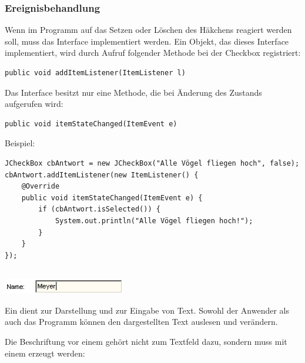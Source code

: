 \subsubsection{Ereignisbehandlung}

Wenn im Programm auf das Setzen oder Löschen des Häkchens reagiert werden soll,
muss das Interface  implementiert werden. Ein Objekt, das
dieses Interface implementiert, wird durch Aufruf folgender Methode bei der
Checkbox registriert:

\begin{lstlisting}
public void addItemListener(ItemListener l)
\end{lstlisting}

Das Interface  besitzt nur eine Methode, die bei Änderung
des Zustands aufgerufen wird:

\begin{lstlisting}
public void itemStateChanged(ItemEvent e)
\end{lstlisting}

Beispiel:

\begin{lstlisting}
JCheckBox cbAntwort = new JCheckBox("Alle Vögel fliegen hoch", false);
cbAntwort.addItemListener(new ItemListener() {
    @Override
    public void itemStateChanged(ItemEvent e) {
        if (cbAntwort.isSelected()) {
            System.out.println("Alle Vögel fliegen hoch!");
        }
    }
});
\end{lstlisting}

\begin{minipage}{0.2\textwidth}
\subsection{}
\end{minipage}
\begin{minipage}{0.8\textwidth}
\includegraphics[width=0.4\textwidth]{./inf/SEKII/24_Java_GUI-Komponenten/JTextField.png}
\end{minipage}


Ein  dient zur Darstellung und zur Eingabe von Text. Sowohl
der Anwender als auch das Programm können den dargestellten Text auslesen und
verändern.

Die Beschriftung vor einem  gehört nicht zum Textfeld dazu,
sondern muss mit einem  erzeugt werden:

